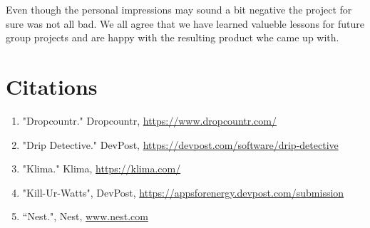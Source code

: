 \documentclass[10pt]{article}
\begin{document}
\begin{multicols*}{2}
\begin{itemize}
\end{itemize}

Even though the personal impressions may sound a bit negative the project for sure was not all bad. We all agree that we have learned valueble lessons for future group projects and are happy with the resulting product whe came up with.\\



\end{multicols*}

\clearpage
\section{Citations}
\begin{enumerate}
  \item "Dropcountr." Dropcountr, \href{https://www.dropcountr.com/}{https://www.dropcountr.com/}
  \item "Drip Detective." DevPost, \href{https://devpost.com/software/drip-detective}{https://devpost.com/software/drip-detective}
  \item "Klima." Klima, \href{https://klima.com/}{https://klima.com/}
  \item "Kill-Ur-Watts", DevPost, \href{https://appsforenergy.devpost.com/submission}{https://appsforenergy.devpost.com/submission}
  \item “Nest.", Nest, \href{http://www.nest.com}{www.nest.com}
\end{enumerate}
\end{document}
